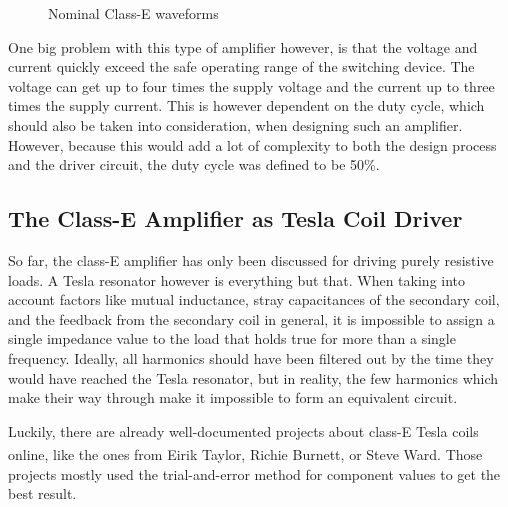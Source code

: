 \begin{figure}[h!]
    \centering
    \caption{Nominal Class-E waveforms}
    \label{fig:nominal-waveforms}
\end{figure}

One big problem with this type of amplifier however, is that the voltage and current quickly exceed the safe operating range of the switching device. The voltage can get up to four times the supply voltage and the current up to three times the supply current. This is however dependent on the duty cycle, which should also be taken into consideration, when designing such an amplifier. However, because this would add a lot of complexity to both the design process and the driver circuit, the duty cycle was defined to be 50\%.

\subsection{The Class-E Amplifier as Tesla Coil Driver}

So far, the class-E amplifier has only been discussed for driving purely resistive loads. A Tesla resonator however is everything but that. When taking into account factors like mutual inductance, stray capacitances of the secondary coil, and the feedback from the secondary coil in general, it is impossible to assign a single impedance value to the load that holds true for more than a single frequency. Ideally, all harmonics should have been filtered out by the time they would have reached the Tesla resonator, but in reality, the few harmonics which make their way through make it impossible to form an equivalent circuit.

Luckily, there are already well-documented projects about class-E Tesla coils online, like the ones from Eirik Taylor\textsuperscript{}, Richie Burnett\textsuperscript{}, or Steve Ward\textsuperscript{}. Those projects mostly used the trial-and-error method for component values to get the best result.

